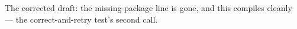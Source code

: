 \documentclass{article}
\begin{document}
The corrected draft: the missing-package line is gone, and this compiles cleanly — the
correct-and-retry test's second call.
\end{document}
